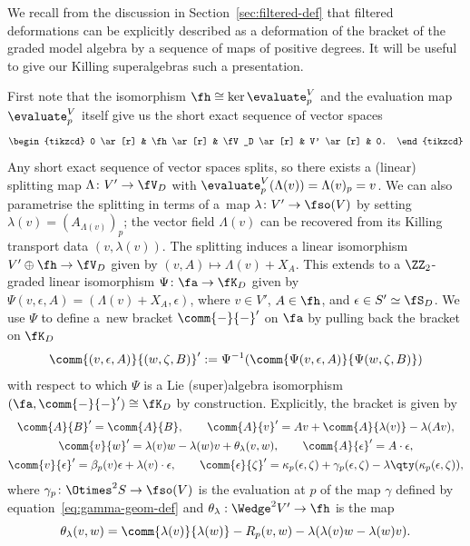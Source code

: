 We recall from the discussion in Section~\ref{sec:filtered-def} that filtered deformations can be explicitly described as a deformation of the bracket of the graded model algebra by a sequence of maps of positive degrees. It will be useful to give our Killing superalgebras such a presentation.

First note that the isomorphism $\fh\cong\ker\evaluate^V_p$ and the evaluation map $\evaluate^V_p$ itself give us the short exact sequence of vector spaces
\[
\begin{tikzcd}
	0 \ar[r] & \fh \ar[r] & \fV_D \ar[r] & V' \ar[r] & 0.
\end{tikzcd}
\]
Any short exact sequence of vector spaces splits, so there exists a (linear) splitting map $\Lambda\colon V'\to \fV_D$ with $\evaluate^V_p(\Lambda(v))=\Lambda(v)_p=v$. We can also parametrise the splitting in terms of a~map $\lambda\colon V'\to \fso(V)$ by setting $\lambda(v)=(A_{\Lambda(v)})_p$; the vector field $\Lambda(v)$ can be recovered from its Killing transport data $(v,\lambda(v))$. The splitting induces a linear isomorphism $V'\oplus\fh\to\fV_D$ given by $(v,A)\mapsto \Lambda(v)+X_A$.
This extends to a $\ZZ_2$-graded linear isomorphism $\Psi\colon \fa \to \fK_D$ given by~${\Psi(v,\epsilon,A) = (\Lambda(v)+X_A,\epsilon)}$,
where $v\in V'$, $A\in\fh$, and $\epsilon\in S'\simeq\fS_D$.
We use $\Psi$ to define a~new bracket $\comm{-}{-}'$ on $\fa$ by pulling back the bracket on $\fK_D$
\[
	\comm{(v,\epsilon,A)}{(w,\zeta,B)}'
		:= \Psi^{-1}(\comm{\Psi(v,\epsilon,A)}{\Psi(w,\zeta,B)})
\]
with respect to which $\Psi$ is a Lie (super)algebra isomorphism $(\fa,\comm{-}{-}')\cong\fK_D$ by construction. Explicitly, the bracket is given by
\begin{gather}
	\comm{A}{B}' = \comm{A}{B},\qquad
	 \comm{A}{v}' = Av + \comm{A}{\lambda(v)}-\lambda(Av),\nonumber	\\
	\comm{v}{w}' = \lambda(v)w-\lambda(w)v + \theta_\lambda(v,w),\qquad
	\comm{A}{\epsilon}' = A\cdot\epsilon,\nonumber	\\
	 \comm{v}{\epsilon}' = \beta_p(v)\epsilon + \lambda(v)\cdot \epsilon,	\qquad
	\comm{\epsilon}{\zeta}'
		 = \kappa_p(\epsilon,\zeta) + \gamma_p(\epsilon,\zeta)-\lambda\qty(\kappa_p(\epsilon,\zeta)),\label{eq:KSA-deformed-brackets}
\end{gather}
where $\gamma_p\colon\Otimes^2S\to\fso(V)$ is the evaluation at $p$ of the map $\gamma$ defined by equation~\eqref{eq:gamma-geom-def} and $\theta_\lambda:\Wedge^2V'\to \fh$ is the map
\[
	\theta_\lambda(v,w)
		= \comm{\lambda(v)}{\lambda(w)} - R_p(v,w) - \lambda(\lambda(v)w-\lambda(w)v).
\]
